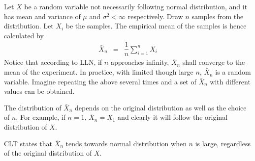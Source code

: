 Let $X$ be a random variable not necessarily following normal distribution, and it has mean and variance of $\mu$ and $\sigma^2<\infty$ respectively. Draw $n$ samples from the distribution. Let $X_i$ be the samples. The empirical mean of the samples is hence calculated by
\begin{eqnarray}
	\bar{X}_n &=& \dfrac{1}{n}\sum_{i=1}^{n}X_i \nonumber
\end{eqnarray}
Notice that according to LLN, if $n$ approaches infinity, $\bar{X}_n$ shall converge to the mean of the experiment. In practice, with limited though large $n$, $\bar{X}_n$ is a random variable. Imagine repeating the above several times and a set of $\bar{X}_n$ with different values can be obtained. 

The distribution of $\bar{X}_n$ depends on the original distribution as well as the choice of $n$. For example, if $n=1$, $\bar{X}_n = X_1$ and clearly it will follow the original distribution of $X$. 

CLT states that $\bar{X}_n$ tends towards normal distribution when $n$ is large, regardless of the original distribution of $X$.

